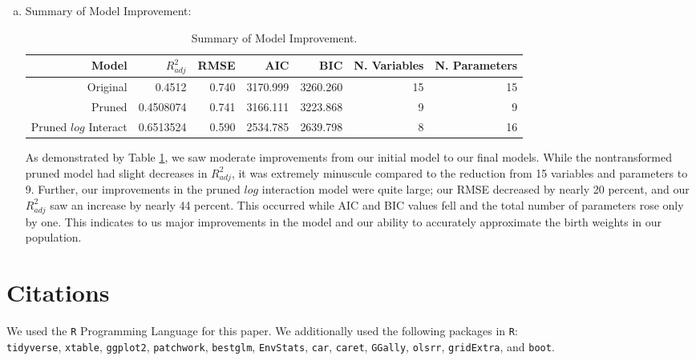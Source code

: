 \documentclass{article}\usepackage[]{graphicx}\usepackage[]{xcolor}
\begin{document}
\begin{enumerate}[a.]
\item{Summary of Model Improvement:}

\begin{table}[H]
\centering
\begin{tabular}{rrrrrrr}
  \hline
   Model & $R^2_{adj}$ & RMSE & AIC &  BIC & N. Variables & N. Parameters\\
  \hline
  Original & 0.4512 & 0.740 &3170.999 & 3260.260 & 15 & 15 \\
  Pruned & 0.4508074 & 0.741 & 3166.111 & 3223.868 & 9 & 9\\
  Pruned $log$ Interact & 0.6513524 & 0.590 & 2534.785 & 2639.798 & 8 & 16\\
  \hline
\end{tabular}
\caption{Summary of Model Improvement.}
\label{model.improvement.summary}
\end{table}

As demonstrated by Table \ref{model.improvement.summary}, we saw moderate improvements from our initial model to our final models. While the nontransformed pruned model had slight decreases in $R^2_{adj}$, it was extremely minuscule compared to the reduction from 15 variables and parameters to 9. Further, our improvements in the pruned $log$ interaction model were quite large; our RMSE decreased by nearly 20 percent, and our $R^2_{adj}$ saw an increase by nearly 44 percent. This occurred while AIC and BIC values fell and the total number of parameters rose only by one. This indicates to us major improvements in the model and our ability to accurately approximate the birth weights in our population.

\end{enumerate} %

\section{Citations}
We used the \texttt{R} Programming Language for this paper. We additionally used the following packages in \texttt{R}:\\ \texttt{tidyverse}, \texttt{xtable}, \texttt{ggplot2}, \texttt{patchwork}, \texttt{bestglm}, \texttt{EnvStats}, \texttt{car}, \texttt{caret}, \texttt{GGally}, \texttt{olsrr}, \texttt{gridExtra}, and \texttt{boot}. 
\end{document}
